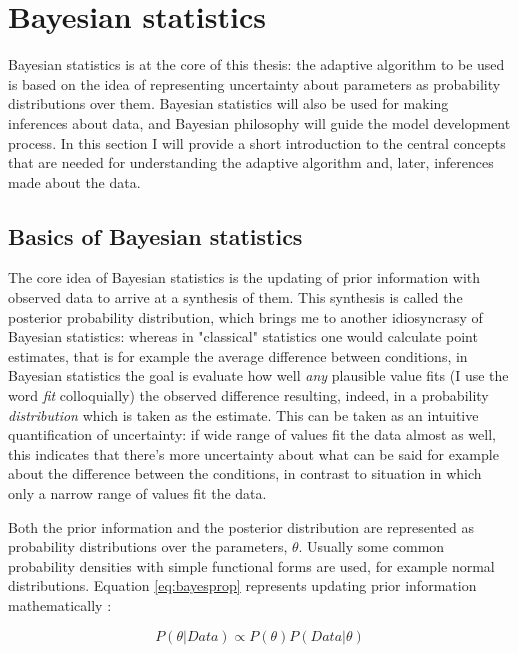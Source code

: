 \documentclass{article}\usepackage{knitr}
\begin{document}

\section{Bayesian statistics}
\label{sec:bayes}

Bayesian statistics is at the core of this thesis: the adaptive algorithm to be used is based on the idea of representing uncertainty about parameters as probability distributions over them. Bayesian statistics will also be used for making inferences about data, and Bayesian philosophy will guide the model development process. In this section I will provide a short introduction to the central concepts that are needed for understanding the adaptive algorithm and, later, inferences made about the data. 

\subsection{Basics of Bayesian statistics}

The core idea of Bayesian statistics is the updating of prior information with observed data to arrive at a synthesis of them. This synthesis is called the posterior probability distribution, which brings me to another idiosyncrasy of Bayesian statistics: whereas in "classical" statistics one would calculate point estimates, that is for example the average difference between conditions, in Bayesian statistics the goal is evaluate how well \textit{any} plausible value fits (I use the word \textit{fit} colloquially) the observed difference resulting, indeed,  in a probability \textit{distribution} which is taken as the estimate. This can be taken as an intuitive quantification of uncertainty: if wide range of values fit the data almost as well, this indicates that there's more uncertainty about what can be said for example about the difference between the conditions, in contrast to situation in which only a narrow range of values fit the data.

Both the prior information and the posterior distribution are represented as probability distributions over the parameters, $\theta$. Usually some common probability densities with simple functional forms are used, for example normal distributions. Equation \ref{eq:bayesprop} represents updating prior information mathematically \citep{kruschke2015}:

\begin{equation}
P(\theta | Data) \propto P(\theta) P(Data | \theta)
\label{eq:bayesprop}
\end{equation} 
\end{document}
